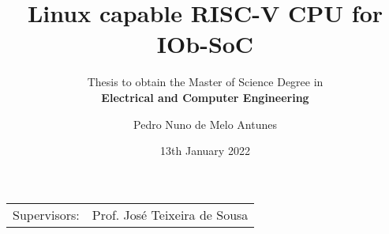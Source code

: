 \documentclass[10pt]{beamer}
\title{Linux capable RISC-V CPU for IOb-SoC}
\subtitle{Thesis to obtain the Master of Science Degree in \\ \textbf{Electrical and Computer Engineering}}
\author{Pedro Nuno de Melo Antunes}
\institute[IST]{Instituto Superior T\'{e}cnico}
\date{13th January 2022}
\begin{document}
\begin{frame}
  \titlepage
  \begin{table}
    \centering
	\begin{tabular}{ll}
             Supervisors: & Prof. José Teixeira de Sousa \\
	\end{tabular}
\end{table}

\end{frame}








\end{document}
